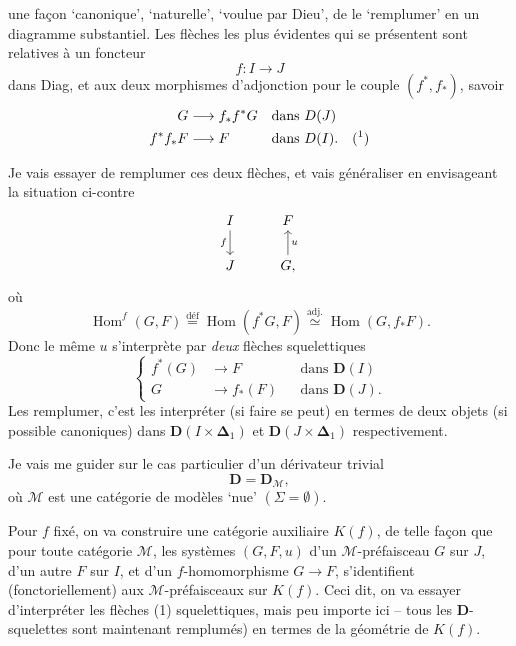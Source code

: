 \documentclass[11pt]{article}
\newcommand{\printedpage}[1]{\marginpar{\footnotesize p.~#1}}
\newcommand{\msp}[1]{\marginpar{\footnotesize [#1]}}
\newcommand{\Hom}{\operatorname{Hom}}
\newcommand{\bDelta}{\boldsymbol{\Delta}}
\begin{document}
\printedpage{4}
\msp{page 78}
une façon ‘canonique’, ‘naturelle’, ‘voulue par Dieu’, de le ‘remplumer’ en un diagramme substantiel. Les flèches les plus évidentes qui se présentent sont relatives à un foncteur
\[ f : I \longrightarrow J \]
dans Diag, et aux deux morphismes d'adjonction pour le couple $(f^*, f_*)$, savoir
\[
\begin{aligned}
G &\longrightarrow f_*f^*G && \text{dans } D(J)\\
f^*f_*F &\longrightarrow F && \text{dans } D(I). \quad (\text{\footnotemark})
\end{aligned}
\]

Je vais essayer de remplumer ces deux flèches, et vais généraliser en envisageant la situation ci-contre
\[
\begin{tikzcd}
I \arrow[d, "f"'] & F \\
J & G, \arrow[u, "u"']
\end{tikzcd}
\]
où
\[ \Hom^f(G,F) \overset{\text{déf}}{=} \Hom(f^*G,F) \overset{\text{adj.}}{\simeq} \Hom(G,f_*F). \]
Donc le même $u$ s'interprète par \textit{deux} flèches squelettiques
\[
\left\{
\begin{aligned}
f^*(G) &\longrightarrow F && \text{dans } \mathbf{D}(I)\\
G &\longrightarrow f_*(F) && \text{dans } \mathbf{D}(J).
\end{aligned}
\right.
\tag*{(1)}
\]
Les remplumer, c'est les interpréter (si faire se peut) en termes de deux objets (si possible canoniques) dans $\mathbf{D}(I \times \bDelta_1)$ et $\mathbf{D}(J \times \bDelta_1)$ respectivement.

Je vais me guider sur le cas particulier d'un dérivateur trivial
\[ \mathbf{D} = \mathbf{D}_{\mathcal{M}}, \]
où $\mathcal{M}$ est une catégorie de modèles ‘nue’ $(\Sigma = \emptyset)$.

\msp{page 79}
Pour $f$ fixé, on va construire une catégorie auxiliaire $K(f)$, de telle façon que pour toute catégorie $\mathcal{M}$, les systèmes $(G,F,u)$ d'un $\mathcal{M}$-préfaisceau $G$ sur $J$, d'un autre $F$ sur $I$, et d'un $f$-homomorphisme $G \longrightarrow F$, s'identifient (fonctoriellement) aux $\mathcal{M}$-préfaisceaux sur
\printedpage{5}
$K(f)$. Ceci dit, on va essayer d'interpréter les flèches (1) squelettiques, mais peu importe ici -- tous les $\mathbf{D}$-squelettes sont maintenant remplumés) en termes de la géométrie de $K(f)$. %
\end{document}
